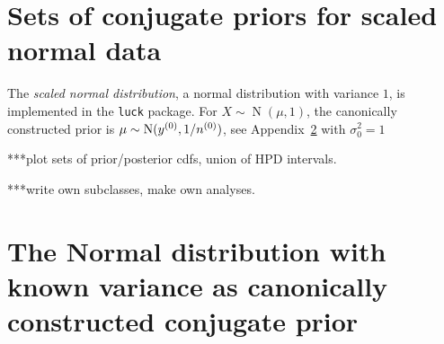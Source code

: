 \documentclass[12pt,a4paper	,twoside]{article}
\newcommand{\norm}{\operatorname{N}}
\begin{document}
\section{Sets of conjugate priors for scaled normal data}

The \emph{scaled normal distribution}, a normal distribution with variance $1$,
is implemented in the \texttt{luck} package.
For $X \sim \norm(\mu,1)$, the canonically constructed prior is $\mu \sim \norm(\yz, 1/\nz)$,
see Appendix~\ref{sec:scalednormalconstruction} with $\sigma^2_0=1$


***plot sets of prior/posterior cdfs, union of HPD intervals.

***write own subclasses, make own analyses.

\appendix

\section{The Normal distribution with known variance as canonically constructed conjugate prior}
\label{sec:scalednormalconstruction}
\end{document}
